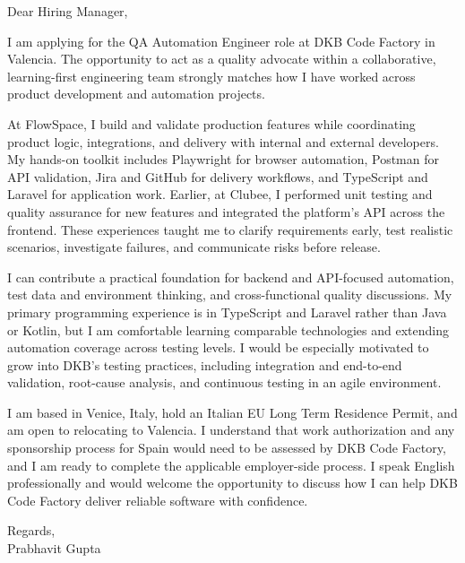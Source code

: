 \documentclass[a4paper,11pt]{article}
\begin{document}
Dear Hiring Manager,

I am applying for the QA Automation Engineer role at DKB Code Factory in Valencia. The opportunity to act as a quality advocate within a collaborative, learning-first engineering team strongly matches how I have worked across product development and automation projects.

At FlowSpace, I build and validate production features while coordinating product logic, integrations, and delivery with internal and external developers. My hands-on toolkit includes Playwright for browser automation, Postman for API validation, Jira and GitHub for delivery workflows, and TypeScript and Laravel for application work. Earlier, at Clubee, I performed unit testing and quality assurance for new features and integrated the platform's API across the frontend. These experiences taught me to clarify requirements early, test realistic scenarios, investigate failures, and communicate risks before release.

I can contribute a practical foundation for backend and API-focused automation, test data and environment thinking, and cross-functional quality discussions. My primary programming experience is in TypeScript and Laravel rather than Java or Kotlin, but I am comfortable learning comparable technologies and extending automation coverage across testing levels. I would be especially motivated to grow into DKB's testing practices, including integration and end-to-end validation, root-cause analysis, and continuous testing in an agile environment.

I am based in Venice, Italy, hold an Italian EU Long Term Residence Permit, and am open to relocating to Valencia. I understand that work authorization and any sponsorship process for Spain would need to be assessed by DKB Code Factory, and I am ready to complete the applicable employer-side process. I speak English professionally and would welcome the opportunity to discuss how I can help DKB Code Factory deliver reliable software with confidence.

Regards,\\
Prabhavit Gupta
\end{document}
